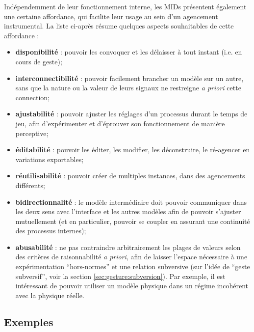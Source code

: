 \noindent Indépendemment de leur fonctionnement interne, les MIDs présentent également une certaine affordance, qui facilite leur usage au sein d'un agencement instrumental. La liste ci-après résume quelques aspects souhaitables de cette affordance :
\vspace{-1em}
\begin{itemize}[noitemsep]
	\item \textbf{disponibilité} : pouvoir les convoquer et les délaisser à tout instant (i.e. en cours de geste);
	\item \textbf{interconnectibilité} : pouvoir facilement brancher un modèle sur un autre, sans que la nature ou la valeur de leurs signaux ne restreigne \textit{a priori} cette connection;
	\item \textbf{ajustabilité} : pouvoir ajuster les réglages d'un processus durant le temps de jeu, afin d'expérimenter et d'éprouver son fonctionnement de manière perceptive;
	\item \textbf{éditabilité} : pouvoir les éditer, les modifier, les déconstruire, le ré-agencer en variations exportables;
	\item \textbf{réutilisabilité} : pouvoir créer de multiples instances, dans des agencements différents;
	\item \textbf{bidirectionnalité} : le modèle intermédiaire doit pouvoir communiquer dans les deux sens avec l'interface et les autres modèles afin de pouvoir s'ajuster mutuellement (et en particulier, pouvoir se coupler en assurant une continuité des processus internes);
	\item \textbf{abusabilité} : ne pas contraindre arbitrairement les plages de valeurs selon des critères de raisonnabilité \textit{a priori}, afin de laisser l'espace nécessaire à une expérimentation ``hors-normes'' et une relation subversive (sur l'idée de ``geste subversif'', voir la section \ref{sec:gesture:subversion}). Par exemple, il est intéressant de pouvoir utiliser un modèle physique dans un régime incohérent avec la physique réelle.
\end{itemize}


\subsection{Exemples}
\label{sec:algorithms:MID:examples}


